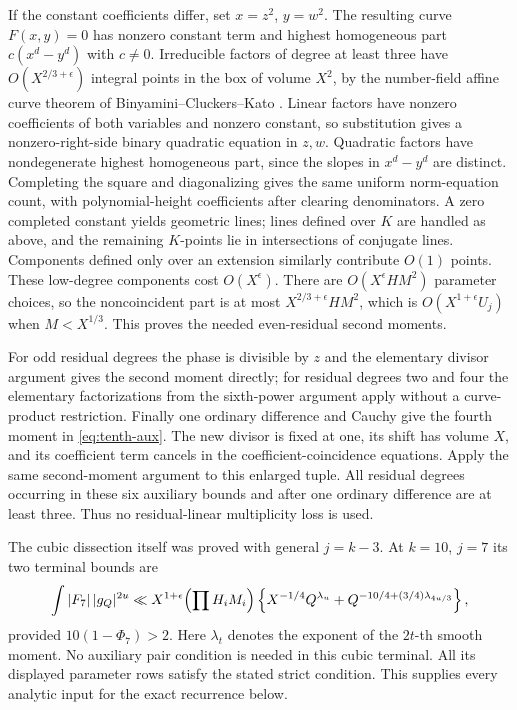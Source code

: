 \documentclass[11pt,reqno]{amsart}
\numberwithin{equation}{section}
\theoremstyle{definition}
\begin{document}
If the constant coefficients differ, set $x=z^2$, $y=w^2$.  The resulting
curve $F(x,y)=0$ has nonzero constant term and highest homogeneous part
$c(x^d-y^d)$ with $c\ne0$.  Irreducible factors of degree at least three
have $O(X^{2/3+\epsilon})$ integral points in the box of volume $X^2$,
by the number-field affine curve theorem of Binyamini--Cluckers--Kato \cite[Corollary~12]{BCK2025}.  Linear factors have nonzero coefficients of both variables
and nonzero constant, so substitution gives a nonzero-right-side binary
quadratic equation in $z,w$.  Quadratic factors have nondegenerate highest
homogeneous part, since the slopes in $x^d-y^d$ are distinct.  Completing
the square and diagonalizing gives the same uniform norm-equation count,
with polynomial-height coefficients after clearing denominators.  A zero
completed constant yields geometric lines; lines defined over $K$ are
handled as above, and the remaining $K$-points lie in intersections of
conjugate lines.  Components defined only over an extension similarly
contribute $O(1)$ points.  These low-degree components cost $O(X^\epsilon)$.
There are $O(X^\epsilon HM^2)$ parameter choices, so the noncoincident part
is at most $X^{2/3+\epsilon}HM^2$, which is $O(X^{1+\epsilon}U_j)$ when
$M<X^{1/3}$.  This proves the needed even-residual second moments.

For odd residual degrees the phase is divisible by $z$ and the elementary
divisor argument gives the second moment directly; for residual degrees
two and four the elementary factorizations from the sixth-power argument
apply without a curve-product restriction.  Finally one ordinary difference
and Cauchy give the fourth moment in \eqref{eq:tenth-aux}.  The new divisor
is fixed at one, its shift has volume $X$, and its coefficient term cancels
in the coefficient-coincidence equations.  Apply the same second-moment
argument to this enlarged tuple.  All residual degrees occurring in these six auxiliary bounds and
after one ordinary difference are at least three.  Thus no residual-linear
multiplicity loss is used.

The cubic dissection itself was proved with general $j=k-3$.  At $k=10$,
$j=7$ its two terminal bounds are
\[
 \int |F_7|\,|g_Q|^{2u}
 \ll X^{1+\epsilon}\Bigl(\prod H_iM_i\Bigr)
 \left\{X^{-1/4}Q^{\lambda_u}
   +Q^{-10/4+(3/4)\lambda_{4u/3}}\right\},
\]
provided $10(1-\Phi_7)>2$.  Here $\lambda_t$ denotes the exponent of the
$2t$-th smooth moment.  No auxiliary pair condition is needed in this cubic
terminal.  All its displayed parameter rows satisfy the stated strict
condition.  This supplies every analytic input for the exact recurrence below.
\end{document}

